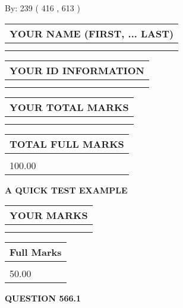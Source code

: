 \documentclass[12pt]{article}
\begin{document}
   
\hspace{1.0in} By: 
 239 ( 416 ,  613 )
   
   
   
   
\newpage 
\setcounter{page}{ 
   566001 } 
   
   
   
   
\noindent\begin{tabular}{|l|}
\hline
YOUR NAME (FIRST, ... LAST)  \\
\hline
 \\ 
 \\ 
\hline
\end{tabular}
\hspace{0.05in} \begin{tabular}{|l|}
\hline
 YOUR   ID   INFORMATION  \\
\hline
 \\ 
 \\ 
\hline
\end{tabular}
   
   
\vspace{0.2in}\noindent\begin{tabular}{|l|}
\hline
YOUR TOTAL MARKS  \\
\hline
 \\ 
 \\ 
\hline
\end{tabular}
\hspace{0.05in} \begin{tabular}{|l|}
\hline
TOTAL FULL MARKS  \\
\hline
 \\ 
100.00 \\
\hline
\end{tabular}
   
   
 \vspace{0.2in}
{\LARGE {\textbf{ A QUICK TEST EXAMPLE}}}
   
   
  
\vspace{0.2in}
  
\noindent\begin{tabular}{|l|}
\hline
 YOUR MARKS  \\
\hline
 \\ 
 \\ 
\hline
\end{tabular}
\hspace{0.05in} \begin{tabular}{|l|}
\hline
 Full Marks  \\
\hline
 \\ 
50.00 \\
\hline
\end{tabular}
{\textbf{\Large{QUESTION
566.1 
}}}
  
\end{document}

